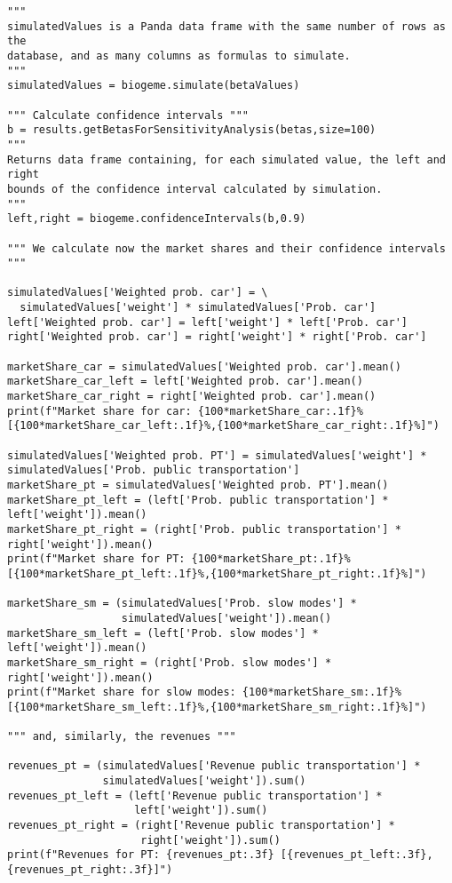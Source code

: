 \documentclass[12pt,a4paper]{article}
\begin{document}
\begin{lstlisting}[style=numbers]
"""
simulatedValues is a Panda data frame with the same number of rows as the
database, and as many columns as formulas to simulate.
"""
simulatedValues = biogeme.simulate(betaValues)

""" Calculate confidence intervals """
b = results.getBetasForSensitivityAnalysis(betas,size=100)
"""
Returns data frame containing, for each simulated value, the left and right 
bounds of the confidence interval calculated by simulation. 
"""
left,right = biogeme.confidenceIntervals(b,0.9)

""" We calculate now the market shares and their confidence intervals """

simulatedValues['Weighted prob. car'] = \
  simulatedValues['weight'] * simulatedValues['Prob. car']
left['Weighted prob. car'] = left['weight'] * left['Prob. car']
right['Weighted prob. car'] = right['weight'] * right['Prob. car']

marketShare_car = simulatedValues['Weighted prob. car'].mean()
marketShare_car_left = left['Weighted prob. car'].mean()
marketShare_car_right = right['Weighted prob. car'].mean()
print(f"Market share for car: {100*marketShare_car:.1f}% [{100*marketShare_car_left:.1f}%,{100*marketShare_car_right:.1f}%]")

simulatedValues['Weighted prob. PT'] = simulatedValues['weight'] * simulatedValues['Prob. public transportation']
marketShare_pt = simulatedValues['Weighted prob. PT'].mean()
marketShare_pt_left = (left['Prob. public transportation'] * left['weight']).mean()
marketShare_pt_right = (right['Prob. public transportation'] * right['weight']).mean()
print(f"Market share for PT: {100*marketShare_pt:.1f}% [{100*marketShare_pt_left:.1f}%,{100*marketShare_pt_right:.1f}%]")

marketShare_sm = (simulatedValues['Prob. slow modes'] *
                  simulatedValues['weight']).mean()
marketShare_sm_left = (left['Prob. slow modes'] * left['weight']).mean()
marketShare_sm_right = (right['Prob. slow modes'] * right['weight']).mean()
print(f"Market share for slow modes: {100*marketShare_sm:.1f}% [{100*marketShare_sm_left:.1f}%,{100*marketShare_sm_right:.1f}%]")

""" and, similarly, the revenues """

revenues_pt = (simulatedValues['Revenue public transportation'] *
               simulatedValues['weight']).sum()
revenues_pt_left = (left['Revenue public transportation'] *
                    left['weight']).sum()
revenues_pt_right = (right['Revenue public transportation'] *
                     right['weight']).sum()
print(f"Revenues for PT: {revenues_pt:.3f} [{revenues_pt_left:.3f},{revenues_pt_right:.3f}]")
\end{lstlisting}
\end{document}
